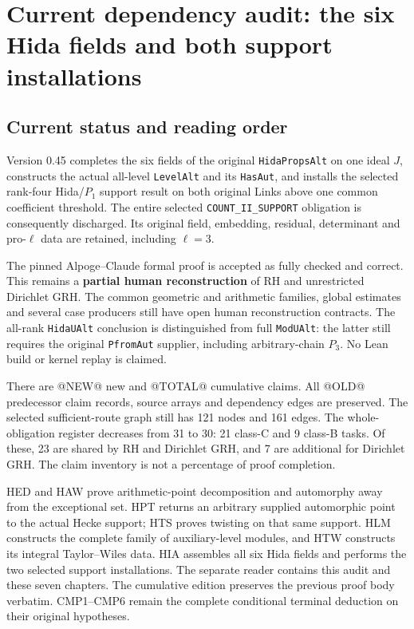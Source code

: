 \section{Current dependency audit: the six Hida fields and both support installations}
\label{sec:dependency-audit-v45}

\subsection{Current status and reading order}

Version 0.45 completes the six fields of the original
\texttt{HidaPropsAlt} on one ideal $J$, constructs the actual
all-level \texttt{LevelAlt} and its \texttt{HasAut}, and installs
the selected rank-four Hida/$P_1$ support result on both original
Links above one common coefficient threshold.  The entire selected
\texttt{COUNT\_II\_SUPPORT} obligation is consequently discharged.
Its original field, embedding, residual, determinant and
pro-$\ell$ data are retained, including $\ell=3$.

The pinned Alpoge--Claude formal proof is accepted as fully checked
and correct.  This remains a \textbf{partial human reconstruction}
of RH and unrestricted Dirichlet GRH.  The common geometric and
arithmetic families, global estimates and several case producers
still have open human reconstruction contracts.  The all-rank
\texttt{HidaUAlt} conclusion is distinguished from full
\texttt{ModUAlt}: the latter still requires the original
\texttt{PfromAut} supplier, including arbitrary-chain $P_3$.
No Lean build or kernel replay is claimed.

There are @NEW@ new and @TOTAL@ cumulative claims.  All @OLD@
predecessor claim records, source arrays and dependency edges are
preserved.  The selected sufficient-route graph still has 121 nodes
and 161 edges.  The whole-obligation register decreases from 31 to
30: 21 class-C and 9 class-B tasks.  Of these, 23 are shared by RH
and Dirichlet GRH, and 7 are additional for Dirichlet GRH.  The
claim inventory is not a percentage of proof completion.

HED and HAW prove arithmetic-point decomposition and automorphy
away from the exceptional set.  HPT returns an arbitrary supplied
automorphic point to the actual Hecke support; HTS proves twisting
on that same support.  HLM constructs the complete family of
auxiliary-level modules, and HTW constructs its integral
Taylor--Wiles data.  HIA assembles all six Hida fields and performs
the two selected support installations.  The separate reader
contains this audit and these seven chapters.  The cumulative
edition preserves the previous proof body verbatim.  CMP1--CMP6
remain the complete conditional terminal deduction on their
original hypotheses.

